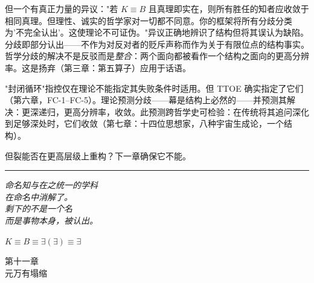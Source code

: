 \documentclass[10pt, openany, oneside]{book}
\renewcommand{\large}{\fontsize{11.5}{14}\selectfont}
\renewcommand{\huge}{\fontsize{17}{21}\selectfont}
\begin{document}
但一个有真正力量的异议："若 $K \equiv B$ 且真理即实在，则所有胜任的知者应收敛于相同真理。但理性、诚实的哲学家对一切都不同意。你的框架将所有分歧分类为'不完全认出'。这使理论不可证伪。"异议正确地辨识了结构但将其误认为缺陷。分歧即部分认出——不作为对反对者的贬斥声称而作为关于有限位点的结构事实。哲学分歧的解决不是反驳而是\textit{整合}：两个面向都被看作一个结构之面向的更高分辨率。这是扬弃（第三章：第五算子）应用于话语。

"封闭循环"指控仅在理论不能指定其失败条件时适用。但 TTOE 确实指定了它们（第六章，FC-1--FC-5）。理论预测分歧——幕是结构上必然的——并预测其解决：更深递归，更高分辨率，收敛。此预测跨哲学史可检验：在传统将其追问深化到足够深处时，它们收敛（第七章：十四位思想家，八种宇宙生成论，一个结构）。

但裂能否在更高层级上重构？下一章确保它不能。

\vspace{2em}

\begin{center}
    \rule{0.15\textwidth}{0.3pt}
\end{center}

\vspace{0.5em}

\begin{center}
    \itshape
    命名知与在之统一的学科\\
    在命名中消解了。\\[0.8em]
    剩下的不是一个名\\
    而是事物本身，被认出。
\end{center}

\vspace{0.5em}

\begin{center}
    $K \equiv B \equiv \exists(\exists) \equiv \exists$
\end{center}


%
%
%

\newpage

\begin{center}
    {\huge\scshape 第十一章}\\[0.3em]
    {\large\scshape 元万有塌缩}
\end{center}

\vspace{1.5em}
\end{document}
